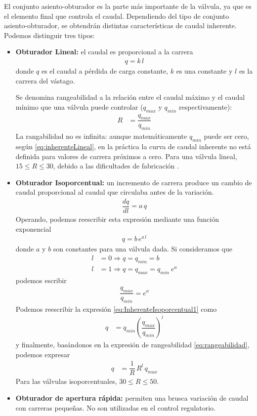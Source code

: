 El conjunto asiento-obturador es la parte más importante de la válvula, ya que
es el elemento final que controla el caudal.
Dependiendo del tipo de conjunto asiento-obturador, se obtendrán distintas
características de caudal inherente.
Podemos distinguir tres tipos:
\begin{itemize}
  \item \textbf{Obturador Lineal:} el caudal es proporcional a la carrera
  \begin{align}
	q = k\,l
	\label{eq:inherenteLineal}
  \end{align}
  donde $q$ es el caudal a pérdida de carga constante, $k$ es una constante y
$l$ es la carrera del vástago.

Se denomina rangeabilidad a la relación entre el caudal máximo y el caudal
mínimo que una válvula puede controlar ($q_{max}$ y $q_{min}$
respectivamente):
\begin{align}
 R &= \dfrac{q_{max}}{q_{min}}
 \label{eq:rangeabilidad}
\end{align}
La rangabilidad no es infinita:
aunque matemáticamente $q_{min}$ puede ser cero, según
\eqref{eq:inherenteLineal}, en la práctica la curva de caudal inherente no está
definida para valores de carrera próximos a cero.
Para una válvula lineal, $15 \leq R \leq 30$, debido a las dificultades
de fabricación \cite{bib:ApuntesPuglesiValvulas}.

  \item \textbf{Obturador Isoporcentual:}
  un incremento de carrera produce un cambio de caudal proporcional al caudal
que circulaba antes de la variación.
  \begin{align}
    \dfrac{dq}{dl} = a \, q
  \end{align}
  Operando, podemos reescribir esta expresión mediante una función exponencial
\begin{align}
 q = b\,e^{a\,l}
 \label{eq:InherenteIsoporcentual1}
\end{align}
  donde $a$ y $b$ son constantes para una válvula dada.
  Si consideramos que
    \begin{align}
        l &= 0 \Rightarrow q = q_{min} = b\\
        l &= 1 \Rightarrow q = q_{max} = q_{min} \:e^a
    \end{align}
    podemos escribir
    \begin{align}
      \dfrac{q_{max}}{q_{min}} = e^a
    \end{align}
    Podemos reescribir la expresión
\eqref{eq:InherenteIsoporcentual1} como
\begin{align}
 q &= q_{min}  \left( {\dfrac{q_{max}}{q_{min}}} \right)^{l}
\end{align}
    y finalmente, basándonos en la expresión de rangeabilidad
\eqref{eq:rangeabilidad}, podemos expresar
    \begin{align}
     q &= \dfrac{1}{R}\, R^l \, q_{max}
    \end{align}
Para las válvulas isoporcentuales, $30 \leq R \leq 50$.
  \item \textbf{Obturador de apertura rápida:} permiten una brusca variación de
caudal con carreras pequeñas.
  No son utilizadas en el control regulatorio.
\end{itemize}

